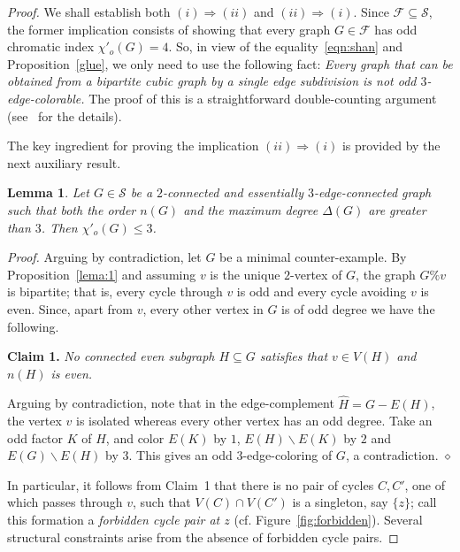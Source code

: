 \documentclass[a4paper,12pt]{article}
\newtheorem{lemma}[theorem]{Lemma}
\numberwithin{equation}{section}
\begin{document}
\begin{proof}
We shall establish both $(i)\Rightarrow (ii)$ and $(ii)\Rightarrow (i)$. Since $\mathcal{F}\subseteq \mathcal{S}$, the former implication consists of showing that every graph $G\in\mathcal{F}$ has odd chromatic index $\chi'_o(G)=4$. So, in view of the equality~\eqref{eqn:shan} and Proposition~\ref{glue}, we only need to use the following fact: \textit{Every graph that can be obtained from a bipartite cubic graph by a single edge subdivision is not odd $3$-edge-colorable.} The proof of this is a straightforward double-counting argument (see~\cite{AtaPetSkr16} for the details).

\smallskip

The key ingredient for proving the implication $(ii)\Rightarrow (i)$ is provided by the next auxiliary result.

\begin{lemma}
    \label{lema:2}
Let $G\in\mathcal{S}$ be a $2$-connected and essentially $3$-edge-connected graph such that both the order $n(G)$ and the maximum degree $\Delta(G)$ are greater than $3$. Then $\chi'_o(G)\leq3$.
\end{lemma}

\medskip

\noindent \textit{Proof.} Arguing by contradiction, let $G$ be a minimal counter-example. By Proposition~\ref{lema:1} and assuming $v$ is the unique $2$-vertex of $G$, the graph $G\%v$ is bipartite; that is, every cycle through $v$ is odd and every cycle avoiding $v$ is even. Since, apart from $v$, every other vertex in $G$ is of odd degree we have the following.

\bigskip

\noindent \textbf{Claim 1.} \textit{No connected even subgraph $H\subseteq G$ satisfies that $v\in V(H)$ and $n(H)$ is even.}

\medskip

\noindent Arguing by contradiction, note that in the edge-complement $\hat{H}=G-E(H)$, the vertex $v$ is isolated whereas every other vertex has an odd degree. Take an odd factor $K$ of $H$, and color $E(K)$ by $1$, $E(H)\backslash E(K)$ by $2$ and $E(G)\backslash E(H)$ by $3$. This gives an odd $3$-edge-coloring of $G$, a contradiction.
\hfill$\diamond$

\bigskip

In particular, it follows from Claim~1 that there is no pair of cycles $C,C'$, one of which passes through $v$, such that $V(C)\cap V(C')$ is a singleton, say $\{z\}$; call this formation a \textit{forbidden cycle pair at $z$} (cf. Figure~\ref{fig:forbidden}).  Several structural constraints arise from the absence of forbidden cycle pairs.


\end{proof}
\end{document}
